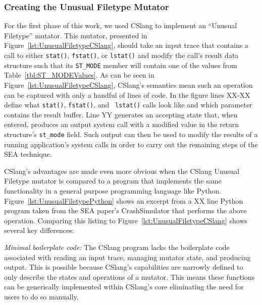 \subsubsection{Creating the Unusual Filetype Mutator}
\label{subsub:UnusualFiletype}
For the first phase of this work,
we used CSlang to implement an ``Unusual Filetype''
mutator.
This mutator, presented in
Figure~\ref{lst:UnusualFiletypeCSlang},
should take an input trace
that contains a call to either {\tt stat()},
{\tt fstat()},
or {\tt lstat()}
and modify the call's result data structure such
that its {\tt ST\_MODE} member will contain one of the values from
Table~\ref{tbl:ST_MODEValues}.  As can be seen in
Figure~\ref{lst:UnusualFiletypeCSlang}, CSlang's semantics mean such an
operation can be captured with only a handful of lines of code.  In the
figure
lines XX-XX define what {\tt stat()}, {\tt fstat()}, and {\tt
lstat()} calls look like and which parameter contains the result buffer.
Line YY generates an accepting state that, when entered, produces an output
system call with a modified value in the return structure's {\tt st\_mode}
field.  Such output can then be used to modify the results of a running
application's system calls in order to carry out the remaining steps of the
SEA technique.


CSlang's advantages are made even more obvious when the CSlang Unusual
Filetype mutator is compared to a program that implements the same
functionality in a general purpose programming language like Python.
Figure~\ref{lst:UnusualFiletypePython} shows an excerpt from a XX line
Python program taken from the SEA paper's CrashSimulator that performs the
above operation.  Comparing this listing to
Figure~\ref{lst:UnusualFiletypeCSlang} shows several key differences:

\textit{Minimal boilerplate code:} The CSlang program lacks the boilerplate
code associated with
reading an input trace, managing mutator state, and producing output.
This is possible because CSlang's capabilities are narrowly defined to
only describe the states and operations of a mutator.  This means these
functions can be generically implemented within CSlang's core eliminating
the need for users to do so manually.

